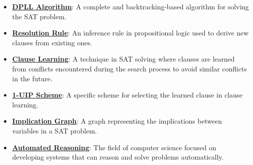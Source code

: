 \documentclass{article}%
\begin{document}
\begin{itemize}[leftmargin=*]
\item \href{https://purdue.brightspace.com/d2l/common/assets/pdfjs-d2l-dist/1.0.14-legacy/web/viewer.html?file=\%2Fcontent\%2Fenforced\%2F1095467-wl.202510.CS.24300.001\%2F15L2-SAT.pdf\%3Fou\%3D1095467\&lang=en-us\&container=d2l-fileviewer-rendered-pdf\&fullscreen=d2l-fileviewer-rendered-pdf-dialog\&height=667#page=21}{\textbf{DPLL Algorithm}}: A complete and backtracking-based algorithm for solving the SAT problem.%
\item \href{https://purdue.brightspace.com/d2l/common/assets/pdfjs-d2l-dist/1.0.14-legacy/web/viewer.html?file=\%2Fcontent\%2Fenforced\%2F1095467-wl.202510.CS.24300.001\%2F15L2-SAT.pdf\%3Fou\%3D1095467\&lang=en-us\&container=d2l-fileviewer-rendered-pdf\&fullscreen=d2l-fileviewer-rendered-pdf-dialog\&height=667#page=32}{\textbf{Resolution Rule}}: An inference rule in propositional logic used to derive new clauses from existing ones.%
\item \href{https://purdue.brightspace.com/d2l/common/assets/pdfjs-d2l-dist/1.0.14-legacy/web/viewer.html?file=\%2Fcontent\%2Fenforced\%2F1095467-wl.202510.CS.24300.001\%2F15L2-SAT.pdf\%3Fou\%3D1095467\&lang=en-us\&container=d2l-fileviewer-rendered-pdf\&fullscreen=d2l-fileviewer-rendered-pdf-dialog\&height=667#page=34}{\textbf{Clause Learning}}: A technique in SAT solving where clauses are learned from conflicts encountered during the search process to avoid similar conflicts in the future.%
\item \href{https://purdue.brightspace.com/d2l/common/assets/pdfjs-d2l-dist/1.0.14-legacy/web/viewer.html?file=\%2Fcontent\%2Fenforced\%2F1095467-wl.202510.CS.24300.001\%2F15L2-SAT.pdf\%3Fou\%3D1095467\&lang=en-us\&container=d2l-fileviewer-rendered-pdf\&fullscreen=d2l-fileviewer-rendered-pdf-dialog\&height=667#page=35}{\textbf{1{-}UIP Scheme}}: A specific scheme for selecting the learned clause in clause learning.%
\item \href{https://purdue.brightspace.com/d2l/common/assets/pdfjs-d2l-dist/1.0.14-legacy/web/viewer.html?file=\%2Fcontent\%2Fenforced\%2F1095467-wl.202510.CS.24300.001\%2F15L2-SAT.pdf\%3Fou\%3D1095467\&lang=en-us\&container=d2l-fileviewer-rendered-pdf\&fullscreen=d2l-fileviewer-rendered-pdf-dialog\&height=667#page=35}{\textbf{Implication Graph}}: A graph representing the implications between variables in a SAT problem.%
\item \href{https://purdue.brightspace.com/d2l/common/assets/pdfjs-d2l-dist/1.0.14-legacy/web/viewer.html?file=\%2Fcontent\%2Fenforced\%2F1095467-wl.202510.CS.24300.001\%2F15L2-SAT.pdf\%3Fou\%3D1095467\&lang=en-us\&container=d2l-fileviewer-rendered-pdf\&fullscreen=d2l-fileviewer-rendered-pdf-dialog\&height=667#page=3}{\textbf{Automated Reasoning}}: The field of computer science focused on developing systems that can reason and solve problems automatically.%

\end{itemize}
\end{document}
